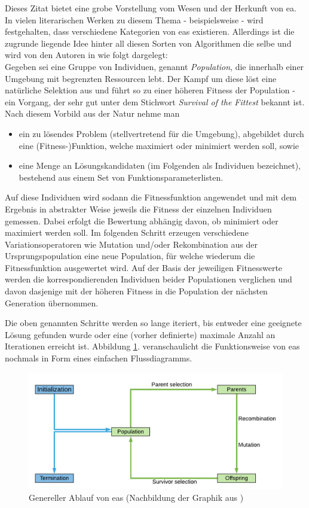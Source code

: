 		Dieses Zitat bietet eine grobe Vorstellung vom Wesen und der Herkunft von \gls{ea}. In vielen literarischen Werken zu diesem Thema - beispielsweise \cite{ger-kla-kru-intro, eib-smi-ea} - wird festgehalten, dass verschiedene Kategorien von \gls{ea}s existieren. Allerdings ist die zugrunde liegende Idee hinter all diesen Sorten von Algorithmen die selbe und wird von den Autoren in \cite{eib-smi-ea} wie folgt dargelegt:\\
		Gegeben sei eine Gruppe von Individuen, genannt \textit{Population}, die innerhalb einer Umgebung mit begrenzten Ressourcen lebt. Der Kampf um diese löst eine natürliche Selektion aus und führt so zu einer höheren Fitness der Population - ein Vorgang, der sehr gut unter dem Stichwort \textit{Survival of the Fittest} bekannt ist. Nach diesem Vorbild aus der Natur nehme man
		\begin{itemize}
			\item ein zu lösendes Problem (stellvertretend für die Umgebung), abgebildet durch eine (Fitness-)Funktion, welche maximiert oder minimiert werden soll, sowie
			\item eine Menge an Lösungskandidaten (im Folgenden als Individuen bezeichnet), bestehend aus einem Set von Funktionsparameterlisten.
		\end{itemize}
		Auf diese Individuen wird sodann die Fitnessfunktion angewendet und mit dem Ergebnis in abstrakter Weise jeweils die Fitness der einzelnen Individuen gemessen. Dabei erfolgt die Bewertung abhängig davon, ob minimiert oder maximiert werden soll. Im folgenden Schritt erzeugen verschiedene Variationsoperatoren wie Mutation und/oder Rekombination aus der Ursprungspopulation eine neue Population, für welche wiederum die Fitnessfunktion ausgewertet wird. Auf der Basis der jeweiligen Fitnesswerte werden die korrespondierenden Individuen beider Populationen verglichen und davon dasjenige mit der höheren Fitness in die Population der nächsten Generation übernommen.
	
		Die oben genannten Schritte werden so lange iteriert, bis entweder eine geeignete Lösung gefunden wurde oder eine (vorher definierte) maximale Anzahl an Iterationen erreicht ist. Abbildung \ref{fig:ea-flowchart}. veranschaulicht die Funktionsweise von \gls{ea}s nochmals in Form eines einfachen Flussdiagramms.
	
		\begin{figure}[h]
			\centering
			\includegraphics[width=0.7\linewidth]{ea_flowchart}
			\caption[Genereller Ablauf von \gls{ea}s]{Genereller Ablauf von \gls{ea}s (Nachbildung der Graphik aus \cite[Seite 27]{eib-smi-ea})}
			\label{fig:ea-flowchart}
		\end{figure}
	
